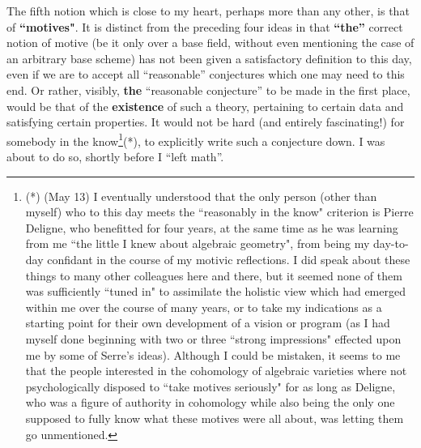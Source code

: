 The fifth notion which is close to my heart, perhaps more than any other, is that of
\textbf{``motives"}.
It is distinct from the preceding four ideas in that
\textbf{``the''} correct notion of motive (be it only over a base field, without even
mentioning the case of an arbitrary base scheme) has not been given a 
satisfactory definition to this day, even if we are to accept all ``reasonable'' conjectures
which one may need to this end. Or rather, visibly, 
\textbf{the} ``reasonable conjecture'' to be made in the first place, would be that of the
\textbf{existence} of such a theory, pertaining to certain data and satisfying certain
properties.
It would not be hard (and entirely fascinating!) for somebody in the
know\footnote{(*) (May 13) I eventually understood that the only person (other than myself) who to this day meets the ``reasonably in the know" criterion is Pierre Deligne, who benefitted for four years, at the same time as he was learning from me ``the little I knew about algebraic geometry", from being my day-to-day confidant in the course of my motivic reflections. I did speak about these things to many other colleagues here and there, but it seemed none of them was sufficiently ``tuned in" to assimilate the holistic view which had emerged within me over the course of many years, or to take my indications as a starting point for their own development of a vision or program (as I had myself done beginning with two or three ``strong impressions" effected upon me by some of Serre's ideas). Although I could be mistaken, it seems to me that the people interested in the cohomology of algebraic varieties where not psychologically disposed to ``take motives seriously" for as long as Deligne, who was a figure of authority in cohomology while also being the only one supposed to fully know what these motives were all about, was letting them go unmentioned.}(*),
to explicitly write such a conjecture down.
I was about to do so, shortly before I ``left math''.

